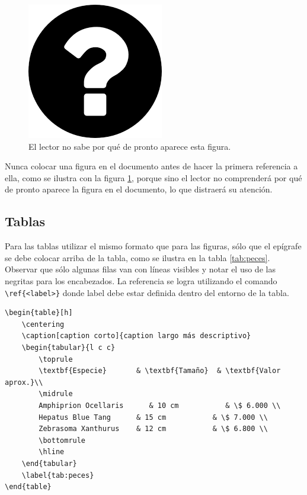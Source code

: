 \begin{figure}[h]
	\centering
	\includegraphics[scale=.4]{./Figures/questionMark.png}
	\caption{El lector no sabe por qué de pronto aparece esta figura.}
	\label{fig:questionMark}
\end{figure}

Nunca colocar una figura en el documento antes de hacer la primera referencia a ella, como se ilustra con la figura \ref{fig:questionMark}, porque sino el lector no comprenderá por qué de pronto aparece la figura en el documento, lo que distraerá su atención.

\subsection{Tablas}

Para las tablas utilizar el mismo formato que para las figuras, sólo que el epígrafe se debe colocar arriba de la tabla, como se ilustra en la tabla \ref{tab:peces}. Observar que sólo algunas filas van con líneas visibles y notar el uso de las negritas para los encabezados.  La referencia se logra utilizando el comando \verb|\ref{<label>}| donde label debe estar definida dentro del entorno de la tabla.

\begin{verbatim}
\begin{table}[h]
	\centering
	\caption[caption corto]{caption largo más descriptivo}
	\begin{tabular}{l c c}    
		\toprule
		\textbf{Especie}       & \textbf{Tamaño}  & \textbf{Valor aprox.}\\
		\midrule
		Amphiprion Ocellaris	  & 10 cm 			& \$ 6.000 \\		
		Hepatus Blue Tang      & 15 cm			 & \$ 7.000 \\
		Zebrasoma Xanthurus    & 12 cm			 & \$ 6.800 \\
		\bottomrule
		\hline
	\end{tabular}
	\label{tab:peces}
\end{table}
\end{verbatim}

